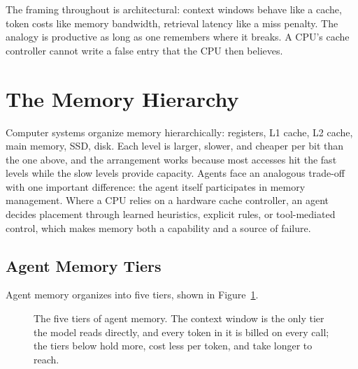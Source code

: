 \documentclass[11pt]{book}
\begin{document}
The framing throughout is architectural: context windows behave like a cache, token costs like memory bandwidth, retrieval latency like a miss penalty. The analogy is productive as long as one remembers where it breaks. A CPU's cache controller cannot write a false entry that the CPU then believes.

\section{The Memory Hierarchy}

Computer systems organize memory hierarchically: registers, L1 cache, L2 cache, main memory, SSD, disk. Each level is larger, slower, and cheaper per bit than the one above, and the arrangement works because most accesses hit the fast levels while the slow levels provide capacity. Agents face an analogous trade-off with one important difference: the agent itself participates in memory management. Where a CPU relies on a hardware cache controller, an agent decides placement through learned heuristics, explicit rules, or tool-mediated control, which makes memory both a capability and a source of failure.

\subsection{Agent Memory Tiers}

Agent memory organizes into five tiers, shown in Figure~\ref{fig:memory-hierarchy}.

\begin{figure}[htbp]
\centering
{}
\caption{The five tiers of agent memory. The context window is the only tier the model reads directly, and every token in it is billed on every call; the tiers below hold more, cost less per token, and take longer to reach.}
\label{fig:memory-hierarchy}
\end{figure}
\end{document}
